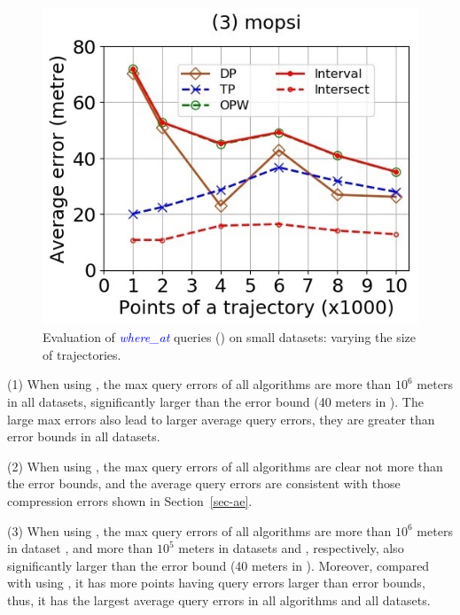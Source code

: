 \begin{figure}[tb!]
	\includegraphics[scale=0.400]{Figures/Exp-where-DAD-error-size-mopsi.jpg}	
	\vspace{-2ex}
	\caption{\small Evaluation of \textcolor{blue}{\emph{where\_at}} queries (\dad) on small datasets: varying the size of trajectories.}
	\label{fig:query-dad-size}
	\vspace{-1ex}
\end{figure}



\ni (1) When using \ped, the max query errors of all algorithms are more than $10^6$ meters in all datasets, significantly larger than the error bound (40 meters in ). The large max errors also lead to larger average query errors, \ie they are greater than error bounds in all datasets.


\ni (2) When using \sed, the max query errors of all algorithms are clear not more than the error bounds, and the average query errors are consistent with those compression errors shown in Section~\ref{sec-ae}.


\ni (3) When using \dad, the max query errors of all algorithms are more than $10^6$ meters in dataset \ucar, and more than $10^5$ meters in datasets \geolife and \mopsi, respectively, also significantly larger than the error bound (40 meters in ). Moreover, compared with using \ped, it has more points having query errors larger than error bounds, thus, it has the largest average query errors in all algorithms and all datasets.


